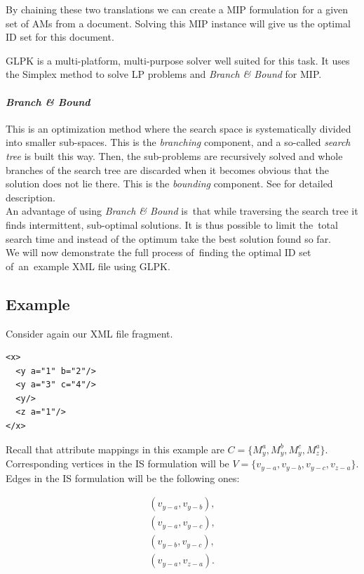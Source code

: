 By chaining these two translations we can create a MIP formulation for a given set of AMs from a document. Solving this MIP instance will give us the optimal ID set for this document.

GLPK is a multi-platform, multi-purpose solver well suited for this task. It uses the Simplex method to solve LP problems and \textit{Branch \& Bound} for MIP. 

\paragraph{\textit{Branch \& Bound}} This is an optimization method where the search space is systematically divided into smaller sub-spaces. This is the \textit{branching} component, and a so-called \textit{search tree} is built this way. Then, the sub-problems are recursively solved and whole branches of the search tree are discarded when it becomes obvious that the solution does not lie there. This is the \textit{bounding} component. See \cite{land60a} for detailed description.\\

An advantage of using \textit{Branch \& Bound} is~that while traversing the search tree it finds intermittent, sub-optimal solutions. It is thus possible to limit the~total search time and instead of the optimum take the best solution found so far.\\

We will now demonstrate the full process of~finding the optimal ID set of~an~example XML file using GLPK.

\subsection*{Example}

Consider again our XML file fragment.

\begin{verbatim}
<x>
  <y a="1" b="2"/>
  <y a="3" c="4"/>
  <y/>
  <z a="1"/>
</x>
\end{verbatim}

Recall that attribute mappings in this example are $C = \{M_{y}^{a}, M_{y}^{b}, M_{y}^{c}, M_{z}^{a}\}$. Corresponding vertices in the IS formulation will be $V = \{v_{y-a}, v_{y-b}, v_{y-c}, v_{z-a}\}$. Edges in the IS formulation will be the following ones:

\begin{eqnarray*}
(v_{y-a},v_{y-b}), \\
(v_{y-a},v_{y-c}), \\
(v_{y-b},v_{y-c}), \\
(v_{y-a},v_{z-a}). \\
\end{eqnarray*}


